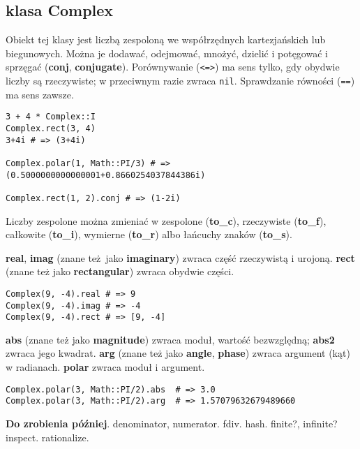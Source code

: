 \subsection{klasa Complex}
Obiekt tej klasy jest liczbą zespoloną we współrzędnych kartezjańskich lub biegunowych.
Można je dodawać, odejmować, mnożyć, dzielić i potęgować i sprzęgać (\textbf{conj}, \textbf{conjugate}).
Porównywanie (\texttt{<=>}) ma sens tylko, gdy obydwie liczby są rzeczywiste; w przeciwnym razie zwraca \texttt{nil}.
Sprawdzanie równości (\texttt{==}) ma sens zawsze.
\begin{verbatim}
3 + 4 * Complex::I
Complex.rect(3, 4)
3+4i # => (3+4i)

Complex.polar(1, Math::PI/3) # => (0.5000000000000001+0.8660254037844386i)

Complex.rect(1, 2).conj # => (1-2i)
\end{verbatim}

Liczby zespolone można zmieniać w zespolone (\textbf{to\_c}), rzeczywiste (\textbf{to\_f}), całkowite (\textbf{to\_i}), wymierne (\textbf{to\_r}) albo łańcuchy znaków (\textbf{to\_s}).

\textbf{real}, \textbf{imag} (znane też jako \textbf{imaginary}) zwraca część rzeczywistą i urojoną.
\textbf{rect} (znane też jako \textbf{rectangular}) zwraca obydwie części.
\begin{verbatim}
Complex(9, -4).real # => 9
Complex(9, -4).imag # => -4
Complex(9, -4).rect # => [9, -4]
\end{verbatim}

\textbf{abs} (znane też jako \textbf{magnitude}) zwraca moduł, wartość bezwzględną; \textbf{abs2} zwraca jego kwadrat.
\textbf{arg} (znane też jako \textbf{angle}, \textbf{phase}) zwraca argument (kąt) w radianach.
\textbf{polar} zwraca moduł i argument.
\begin{verbatim}
Complex.polar(3, Math::PI/2).abs  # => 3.0
Complex.polar(3, Math::PI/2).arg  # => 1.57079632679489660
\end{verbatim}


\textbf{Do zrobienia później}.
denominator, numerator.
fdiv.
hash.
finite?, infinite?
inspect.
rationalize.
